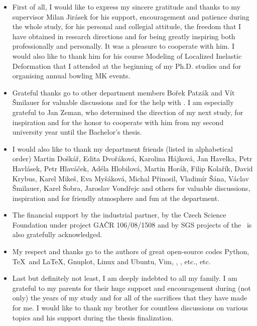 \begin{itemize}

\item
First of all, I would like to express my sincere gratitude and thanks to my supervisor Milan Jirásek
for his support, encouragement and patience during the whole study,
for his personal and collegial attitude,
the freedom that I have obtained in research directions
and for being greatly inspiring both professionally and personally.
It was a pleasure to cooperate with him.
I would also like to thank him for his course Modeling of Localized Inelastic Deformation that I attended at the beginning of my Ph.D. studies and for organising annual bowling MK events.

\item
Grateful thanks go to other department members Bořek Patzák and Vít Šmilauer for valuable discussions and for the help with \OOFEM.
I am especially grateful to Jan Zeman, who determined the direction of my next study,
for inspiration and for the honor to cooperate with him from my second university year until the Bachelor's thesis.

\item
\begin{sloppypar}
I would also like to thank my department friends (listed in alphabetical order)
\mbox{Martin} Doškář,
Edita Dvořáková,
Karolina Hájková,
Jan Havelka,
Petr Havlásek,
Petr Hlaváček,
Adéla Hlobilová,
Martin Horák,
Filip Kolařík,
David Krybus,
Karel Mikeš,
Eva Myšáková,
Michal Přinosil,
Vladimír Šána,
Václav Šmilauer,
Karel \mbox{Šobra},
Jaroslav Vondřejc
and others
for valuable discussions, inspiration and for friendly atmosphere and fun at the department.
\end{sloppypar}

\item
The financial support by the industrial partner, by the Czech Science Foundation under project GAČR 106/08/1508 and by SGS projects of the \university\ is also gratefully acknowledged.

\item
My respect and thanks go to the authors of great open-source codes
Python,
\TeX\ and \LaTeX,
Gnuplot,
Linux and Ubuntu,
Vim,
\YADE,
\OOFEM,
etc., etc.

\item
Last but definitely not least, I am deeply indebted to all my family.
I am grateful to my parents for their huge support and encouragement during (not only) the years of my study and for all of the sacrifices that they have made for me.
I would like to thank my brother for countless discussions on various topics and his support during the thesis finalization.


\end{itemize}
